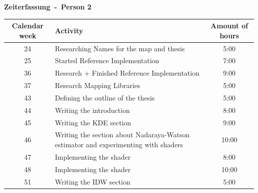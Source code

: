 \textbf{\huge Zeiterfassung~-~Person 2}

\begin{table}[H]
    \centering
    \begin{tabularx}{\textwidth}{|c|X|c|}%
        \hline %
        Calendar week & Activity                                                                           & Amount of hours \\
        \hline %
        24            & Researching Names for the map and thesis                                           & 5:00            \\
        \hline %
        25            & Started Reference Implementation                                                   & 7:00            \\
        \hline %
        36            & Research + Finished Reference Implementation                                       & 9:00            \\
        \hline %
        37            & Research Mapping Libraries                                                         & 5:00            \\
        \hline %
        43            & Defining the outline of the thesis                                                 & 5:00            \\
        \hline %
        44            & Writing the introduction                                                           & 8:00            \\
        \hline %
        45            & Writing the KDE section                                                            & 9:00            \\
        \hline %
        46            & Writing the section about Nadaraya-Watson estimator and experimenting with shaders & 10:00           \\
        \hline %
        47            & Implementing the shader                                                            & 8:00            \\
        \hline %
        48            & Implementing the shader                                                            & 10:00           \\
        \hline %
        51            & Writing the IDW section                                                            & 5:00            \\
        \hline %

\end{tabularx}
\end{table}
